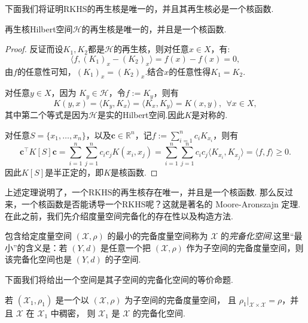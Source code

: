 \documentclass[../master.tex]{subfiles}
\begin{document}
下面我们将证明RKHS的再生核是唯一的，并且其再生核必是一个核函数.
\begin{theorem}[RKHS决定再生核]
    再生核Hilbert空间$\mathcal{H}$的再生核是唯一的，并且是一个核函数.
\end{theorem}

\begin{proof}
    反证而设$K_1,K_2$都是$\mathcal{H}$的再生核，则对任意$x\in X$，有:
    \begin{equation*}
        \langle f,(K_1)_x-(K_2)_x\rangle=f(x)-f(x)=0,
    \end{equation*}
    由$f$的任意性可知，$(K_1)_x=(K_2)_x$.结合$x$的任意性得$K_1=K_2$.

    对任意$y\in X$，因为 $K_y\in\mathcal{H}$，令$f:=K_y$，则有
    \begin{equation*}
        K(y,x)=\langle K_y,K_x\rangle=\langle K_x,K_y\rangle=K(x,y),~~\forall x\in X,
    \end{equation*}
    其中第二个等式是因为$\mathcal{H}$是实的Hilbert空间.因此$K$是对称的.

    对任意$S=\{x_1,\dots,x_n\}$，以及$\boldsymbol{c}\in\mathbb{R}^n$，记$f:=\sum_{i=1}^n c_i K_{x_i}$，则有
    \begin{equation*}
        \boldsymbol{c}^\top K[S]\boldsymbol{c}=\sum_{i=1}^n\sum_{j=1}^nc_ic_jK(x_i,x_j)=\sum_{i=1}^n\sum_{j=1}^nc_ic_j\langle K_{x_i},K_{x_j}\rangle = \langle f,f\rangle\geq 0.
    \end{equation*}
    因此$K[S]$是半正定的，即$K$是核函数.
\end{proof}

上述定理说明了，一个RKHS的再生核存在唯一，并且是一个核函数. 那么反过来，一个核函数是否能诱导一个RKHS呢？这就是著名的 Moore-Aronszajn 定理.在此之前，我们先介绍度量空间完备化的存在性以及构造方法.
\begin{definition}[完备化空间]\label{def:completion}
包含给定度量空间 $(\mathcal{X},\rho)$ 的最小的完备度量空间称为 $\mathcal{X}$ 的\emph{完备化空间}.这里“最小”的含义是：若 $(Y,d)$ 是任意一个把 $(\mathcal{X},\rho)$ 作为子空间的完备度量空间，则该完备化空间也是 $(Y,d)$ 的子空间.
\end{definition}


下面我们将给出一个空间是其子空间的完备化空间的等价命题.
\begin{proposition}
若 $(\mathcal X_1,\rho_1)$ 是一个以 $(\mathcal X,\rho)$ 为子空间的完备度量空间，
且 $\rho_1|_{\mathcal X\times\mathcal X}=\rho$，并且 $\mathcal X$ 在 $\mathcal X_1$ 中稠密，
则 $\mathcal X_1$ 是 $\mathcal X$ 的完备化空间.
\end{proposition}
\end{document}
